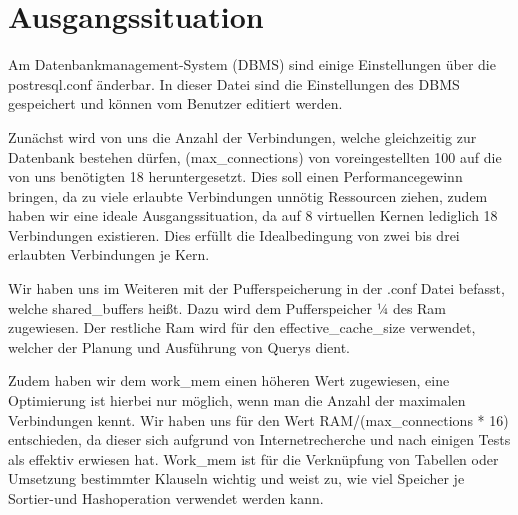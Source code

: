 \section{Ausgangssituation}
Am Datenbankmanagement-System (DBMS) sind einige Einstellungen über die postresql.conf änderbar. In 
dieser Datei sind die Einstellungen des DBMS gespeichert und können vom Benutzer editiert werden. 

Zunächst wird von uns die Anzahl der Verbindungen, welche gleichzeitig zur Datenbank bestehen 
dürfen, (max\_connections) von voreingestellten 100 auf die von uns benötigten
18 heruntergesetzt.
Dies soll einen Performancegewinn bringen, da zu viele erlaubte Verbindungen unnötig Ressourcen 
ziehen, zudem haben wir eine ideale Ausgangssituation, da auf 8 virtuellen Kernen lediglich 18 
Verbindungen existieren. Dies erfüllt die Idealbedingung von zwei bis drei erlaubten Verbindungen 
je Kern.

Wir haben uns im Weiteren mit der Pufferspeicherung in der .conf Datei befasst, welche 
shared\_buffers heißt. Dazu wird dem Pufferspeicher ¼ des Ram zugewiesen. Der
restliche Ram wird für den effective\_cache\_size verwendet, welcher der Planung
und Ausführung von Querys dient.

Zudem haben wir dem work\_mem einen höheren Wert zugewiesen, eine Optimierung
ist hierbei nur möglich, wenn man die Anzahl der maximalen Verbindungen kennt. Wir haben uns für den Wert 
RAM/(max\_connections * 16) entschieden, da dieser sich aufgrund von
Internetrecherche und nach einigen Tests als effektiv erwiesen hat. Work\_mem
ist für die Verknüpfung von Tabellen oder Umsetzung bestimmter Klauseln wichtig und weist zu, wie viel Speicher je Sortier-und Hashoperation 
verwendet werden kann.

\clearpage